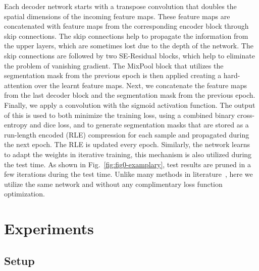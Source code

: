 \documentclass[journal]{IEEEtran}
\begin{document}
Each decoder network starts with a  transpose convolution that doubles the spatial dimensions of the incoming feature maps. These feature maps are concatenated with feature maps from the corresponding encoder block through skip connections. The skip connections help to propagate the information from the upper layers, which are sometimes lost due to the depth of the network. The skip connections are followed by two SE-Residual blocks, which help to eliminate the problem of vanishing gradient. The MixPool block that utilizes the segmentation mask from the previous epoch is then applied creating a hard-attention over the learnt feature maps. Next, we concatenate the feature maps from the last decoder block and the segmentation mask from the previous epoch. Finally, we apply a  convolution with the sigmoid activation function. The output of this is used to both minimize the training loss, using a combined binary cross-entropy and dice loss, and to generate segmentation masks that are stored as a run-length encoded (RLE) compression for each sample and propagated during the next epoch. The RLE is updated every epoch. 
Similarly, the network learns to adapt the weights in iterative training, this mechanism is also utilized during the test time. As shown in Fig.~\ref{fig:fig0-examplary}, test results are pruned in a few iterations during the test time. Unlike many methods in literature~\cite{mosinska2018beyond,Prashant:ECCV20}, here we utilize the same network and without any complimentary loss function optimization. 

\section{Experiments}
\label{experiments}
\subsection{Setup}
\end{document}
